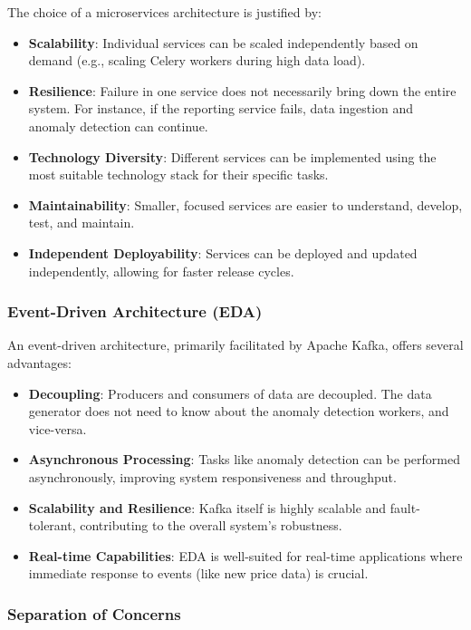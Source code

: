 The choice of a microservices architecture is justified by:
\begin{itemize}
    \item \textbf{Scalability}: Individual services can be scaled independently based on demand (e.g., scaling Celery workers during high data load).
    \item \textbf{Resilience}: Failure in one service does not necessarily bring down the entire system. For instance, if the reporting service fails, data ingestion and anomaly detection can continue.
    \item \textbf{Technology Diversity}: Different services can be implemented using the most suitable technology stack for their specific tasks.
    \item \textbf{Maintainability}: Smaller, focused services are easier to understand, develop, test, and maintain.
    \item \textbf{Independent Deployability}: Services can be deployed and updated independently, allowing for faster release cycles.
\end{itemize}

\subsubsection{Event-Driven Architecture (EDA)}

An event-driven architecture, primarily facilitated by Apache Kafka, offers several advantages:
\begin{itemize}
    \item \textbf{Decoupling}: Producers and consumers of data are decoupled. The data generator does not need to know about the anomaly detection workers, and vice-versa.
    \item \textbf{Asynchronous Processing}: Tasks like anomaly detection can be performed asynchronously, improving system responsiveness and throughput.
    \item \textbf{Scalability and Resilience}: Kafka itself is highly scalable and fault-tolerant, contributing to the overall system's robustness.
    \item \textbf{Real-time Capabilities}: EDA is well-suited for real-time applications where immediate response to events (like new price data) is crucial.
\end{itemize}

\subsubsection{Separation of Concerns}

